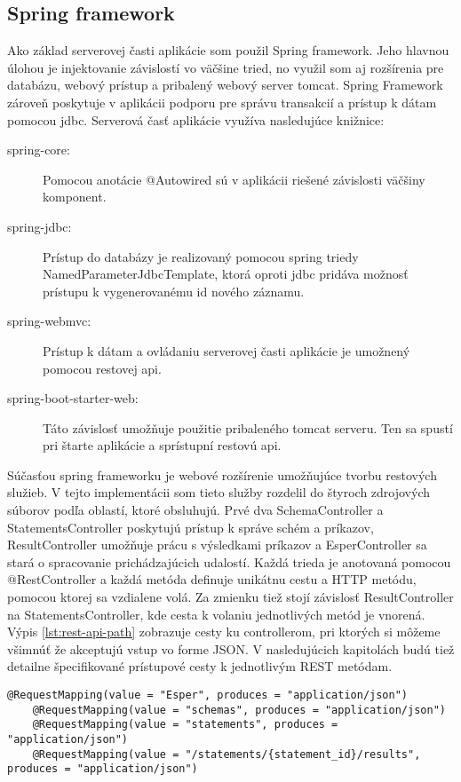 	\subsection{Spring framework}
		Ako základ serverovej časti aplikácie som použil Spring framework. Jeho hlavnou úlohou je injektovanie závislostí vo väčšine tried, no využil som aj rozšírenia pre databázu, webový prístup a pribalený webový server tomcat.
		Spring Framework zároveň poskytuje v aplikácii podporu pre správu transakcií a prístup k dátam pomocou jdbc. Serverová časť aplikácie využíva nasledujúce knižnice:
		\begin{description}
			\item[spring-core:] Pomocou anotácie @Autowired sú v aplikácii riešené závislosti väčšiny komponent.
			\item[spring-jdbc:] Prístup do databázy je realizovaný pomocou spring triedy NamedParameterJdbcTemplate, ktorá oproti jdbc pridáva možnosť prístupu k vygenerovanému id nového záznamu.
			\item[spring-webmvc:] Prístup k dátam a ovládaniu serverovej časti aplikácie je umožnený pomocou restovej api.
			\item[spring-boot-starter-web:] Táto závislosť umožňuje použitie pribaleného tomcat serveru. Ten sa spustí pri štarte aplikácie a sprístupní restovú api.
		\end{description}
		
		Súčasťou spring frameworku je webové rozšírenie umožňujúce tvorbu restových služieb. V tejto implementácii som tieto služby rozdelil do štyroch zdrojových súborov podľa oblastí, ktoré obsluhujú. Prvé dva SchemaController a StatementsController poskytujú prístup k správe schém a príkazov, ResultController umožňuje prácu s výsledkami príkazov a EsperController sa stará o spracovanie prichádzajúcich udalostí. Každá trieda je anotovaná pomocou @RestController a každá metóda definuje unikátnu cestu a HTTP metódu, pomocou ktorej sa vzdialene volá. Za zmienku tiež stojí závislosť ResultController na StatementsController, kde cesta k volaniu jednotlivých metód je vnorená. Výpis \ref{lst:rest-api-path} zobrazuje cesty ku controllerom, pri ktorých si môžeme všimnúť že akceptujú vstup vo forme JSON. V nasledujúcich kapitolách budú tiež detailne špecifikované prístupové cesty k jednotlivým REST metódam.
		
		\begin{lstlisting}[label=lst:rest-api-path,caption=Definícia ciest REST API]
	@RequestMapping(value = "Esper", produces = "application/json")
	@RequestMapping(value = "schemas", produces = "application/json")
	@RequestMapping(value = "statements", produces = "application/json")
	@RequestMapping(value = "/statements/{statement_id}/results", produces = "application/json")
		\end{lstlisting}
		
